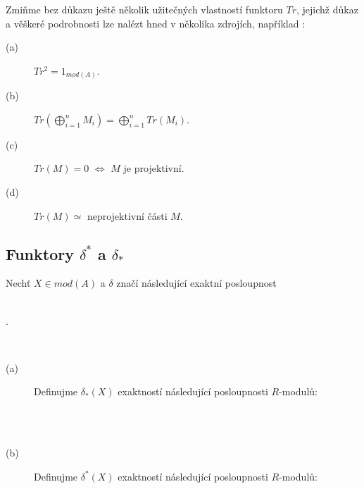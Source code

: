     \begin{pzn}
       Zmiňme bez důkazu ještě několik užitečných vlastností funktoru $Tr$, 
       jejichž důkaz a věškeré podrobnosti lze nalézt hned v několika zdrojích, 
       například \cite{2}:
       \begin{description}
         \item[(a)] $Tr^2=1_{\underline{mod}(A)}$.
         \item[(b)] $Tr(\bigoplus_{i=1}^n M_i)=\bigoplus_{i=1}^n Tr(M_i)$. 
         \item[(c)] $Tr(M)=0$ $\Leftrightarrow$ $M$ je projektivní. 
         \item[(d)] $Tr(M)\simeq$ neprojektivní části $M$.
       \end{description}
     \end{pzn}
     
   \subsection{Funktory $\delta^*$ a $\delta_*$} 
     
     \begin{dfn}\label{def-delta-*}
       Nechť $X\in mod(A)$ a $\delta$ značí následující exaktní posloupnost \\\\
       \centerline{.}\\
       \begin{description}
         \item[(a)] Definujme $\delta_*(X)$ exaktností následující posloupnosti $R$-modulů: \\\\
           \centerline{}\\ 
         \item[(b)] Definujme $\delta^*(X)$ exaktností následující posloupnosti $R$-modulů: \\\\
           \centerline{}  
       \end{description}
     \end{dfn}
     
